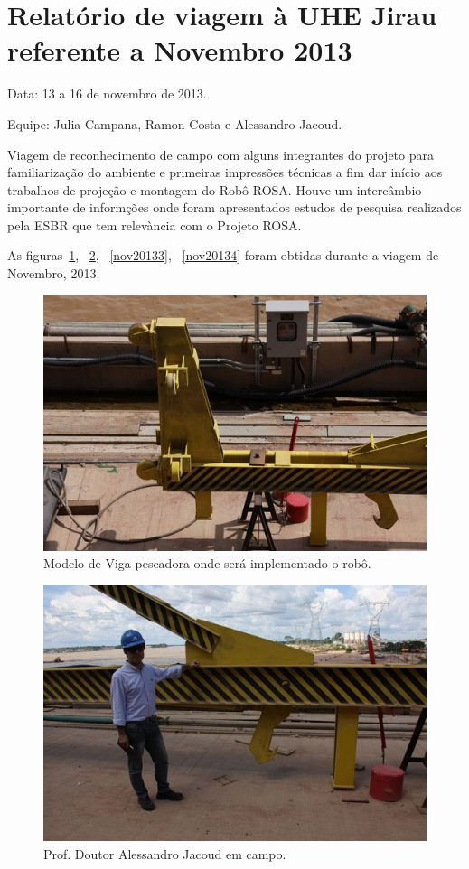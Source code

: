 \section{Relatório de viagem à UHE Jirau
referente a Novembro 2013}\label{sec::nov2013}
Data: 13 a 16 de novembro de 2013.

Equipe: Julia Campana, Ramon Costa e Alessandro Jacoud.


Viagem de reconhecimento de campo com alguns integrantes do projeto para
familiarização do ambiente e primeiras impressões técnicas a fim dar início aos
trabalhos de projeção e montagem do Robô ROSA. Houve um intercâmbio importante
de informções onde foram apresentados estudos de pesquisa realizados pela ESBR
que tem relevància com o Projeto ROSA.

As figuras~\ref{nov20131}, ~\ref{nov20132}, ~\ref{nov20133}, ~\ref{nov20134}
foram obtidas durante a viagem de Novembro, 2013.



\begin{figure}[h!]
\centering
  \includegraphics[width=1\linewidth]{Fotos/Novembro2013/1.jpg}
  \caption{Modelo de Viga pescadora onde será implementado o robô.}
  \label{nov20131}
\end{figure}

\begin{figure}[h!]
  \centering
  \includegraphics[width=1\linewidth]{Fotos/Novembro2013/2.jpg}
  \caption{Prof. Doutor Alessandro Jacoud em campo.}
  \label{nov20132}
\end{figure}

